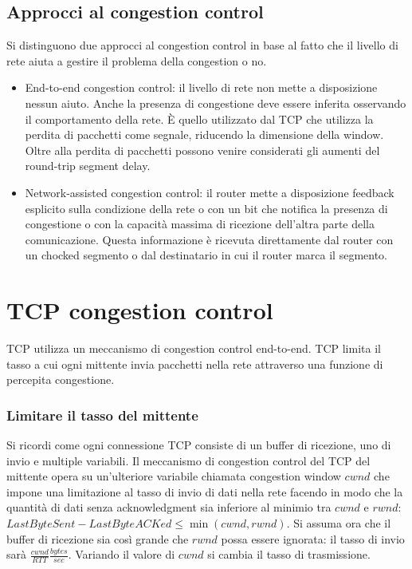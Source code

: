 \subsection{Approcci al congestion control}
Si distinguono due approcci al congestion control in base al fatto che il livello di rete aiuta a gestire il problema della congestion o no.
\begin{itemize}
\item End-to-end congestion control: il livello di rete non mette a disposizione nessun aiuto. Anche la presenza di congestione deve essere inferita 
osservando il comportamento della rete. \`E quello utilizzato dal TCP che utilizza la perdita di pacchetti come segnale, riducendo la dimensione della 
window. Oltre alla perdita di pacchetti possono venire considerati gli aumenti del round-trip segment delay. 
\item Network-assisted congestion control: il router mette a disposizione feedback esplicito sulla condizione della rete o con un bit che notifica la 
presenza di congestione o con la capacit\`a massima di ricezione dell'altra parte della comunicazione. Questa informazione \`e ricevuta direttamente dal 
router con un chocked segmento o dal destinatario in cui il router marca il segmento. 
\end{itemize}
\section{TCP congestion control}
TCP utilizza un meccanismo di congestion control end-to-end. TCP limita il tasso a cui ogni mittente invia pacchetti nella rete attraverso una funzione
di percepita congestione.
\subsubsection{Limitare il tasso del mittente}
Si ricordi come ogni connessione TCP consiste di un buffer di ricezione, uno di invio e multiple variabili. Il meccanismo di congestion control del TCP del
mittente opera su un'ulteriore variabile chiamata congestion window $cwnd$ che impone una limitazione al tasso di invio di dati nella rete facendo in modo
che la quantit\`a di dati senza acknowledgment sia inferiore al minimio tra $cwnd$ e $rwnd$: $LastByteSent-LastByteACKed\le\min(cwnd, rwnd)$. Si assuma ora
che il buffer di ricezione sia cos\`i grande che $rwnd$ possa essere ignorata: il tasso di invio sar\`a $\frac{cwnd}{RTT}\frac{bytes}{sec}$. Variando il
valore di $cwnd$ si cambia il tasso di trasmissione. 
